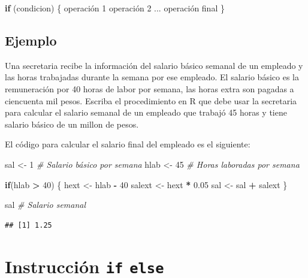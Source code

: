\documentclass[10pt,]{krantz}
\makeatletter
\newenvironment{Shaded}{\begin{snugshade}}{\end{snugshade}}
\newcommand{\DecValTok}[1]{\textcolor[rgb]{0.00,0.00,0.81}{#1}}
\newcommand{\FloatTok}[1]{\textcolor[rgb]{0.00,0.00,0.81}{#1}}
\newcommand{\StringTok}[1]{\textcolor[rgb]{0.31,0.60,0.02}{#1}}
\newcommand{\CommentTok}[1]{\textcolor[rgb]{0.56,0.35,0.01}{\textit{#1}}}
\newcommand{\ControlFlowTok}[1]{\textcolor[rgb]{0.13,0.29,0.53}{\textbf{#1}}}
\newcommand{\OperatorTok}[1]{\textcolor[rgb]{0.81,0.36,0.00}{\textbf{#1}}}
\newcommand{\NormalTok}[1]{#1}
\newenvironment{kframe}{%
\medskip{}
\setlength{\fboxsep}{.8em}
 \def\at@end@of@kframe{}%
 \ifinner\ifhmode%
  \def\at@end@of@kframe{\end{minipage}}%
  \begin{minipage}{\columnwidth}%
 \fi\fi%
 \def\FrameCommand##1{\hskip\@totalleftmargin \hskip-\fboxsep
 \colorbox{shadecolor}{##1}\hskip-\fboxsep
     \hskip-\linewidth \hskip-\@totalleftmargin \hskip\columnwidth}%
 \MakeFramed {\advance\hsize-\width
   \@totalleftmargin\z@ \linewidth\hsize
   \@setminipage}}%
 {\par\unskip\endMakeFramed%
 \at@end@of@kframe}
\renewenvironment{Shaded}{\begin{kframe}}{\end{kframe}}
\makeatother
\begin{document}
\begin{Shaded}
\begin{Highlighting}[]
\ControlFlowTok{if}\NormalTok{ (condicion) \{}
\NormalTok{  operación }\DecValTok{1}
\NormalTok{  operación }\DecValTok{2}
\NormalTok{  ...}
\NormalTok{  operación final}
\NormalTok{\}}
\end{Highlighting}
\end{Shaded}

\subsection*{Ejemplo}\label{ejemplo-15}


Una secretaria recibe la información del salario básico semanal de un
empleado y las horas trabajadas durante la semana por ese empleado. El
salario básico es la remuneración por 40 horas de labor por semana, las
horas extra son pagadas a ciencuenta mil pesos. Escriba el procedimiento
en R que debe usar la secretaria para calcular el salario semanal de un
empleado que trabajó 45 horas y tiene salario básico de un millon de
pesos.

El código para calcular el salario final del empleado es el siguiente:

\begin{Shaded}
\begin{Highlighting}[]
\NormalTok{sal <-}\StringTok{ }\DecValTok{1}  \CommentTok{# Salario básico por semana}
\NormalTok{hlab <-}\StringTok{ }\DecValTok{45}   \CommentTok{# Horas laboradas por semana}

\ControlFlowTok{if}\NormalTok{(hlab }\OperatorTok{>}\StringTok{ }\DecValTok{40}\NormalTok{) \{}
\NormalTok{  hext <-}\StringTok{ }\NormalTok{hlab }\OperatorTok{-}\StringTok{ }\DecValTok{40}
\NormalTok{  salext <-}\StringTok{ }\NormalTok{hext }\OperatorTok{*}\StringTok{ }\FloatTok{0.05}
\NormalTok{  sal <-}\StringTok{ }\NormalTok{sal }\OperatorTok{+}\StringTok{ }\NormalTok{salext}
\NormalTok{\}}

\NormalTok{sal  }\CommentTok{# Salario semanal}
\end{Highlighting}
\end{Shaded}

\begin{verbatim}
## [1] 1.25
\end{verbatim}

\section{\texorpdfstring{Instrucción \texttt{if} \texttt{else}
}{Instrucción if else }}\label{instruccion-if-else}
\end{document}
